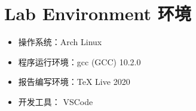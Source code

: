 \section{Lab Environment 环境}
\begin{itemize}
    \item 操作系统：Arch Linux
    \item 程序运行环境：gcc (GCC) 10.2.0
    \item 报告编写环境：TeX Live 2020
    \item 开发工具： VSCode
\end{itemize}